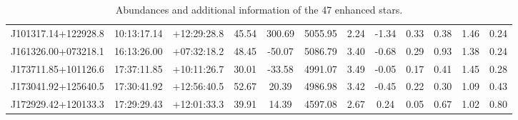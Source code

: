 \documentclass[a4paper,fleqn,usenatbib]{mnras}
\begin{document}
\begin{table}
\begin{tabular}{@{}cccccccccccc@{}}
			J101317.14+122928.8 & 10:13:17.14 & +12:29:28.8  & 45.54               	& 300.69              	& 5055.95             	& 2.24           	& -1.34              	& 0.33                   	& 0.38                     	& 1.46             	& 0.24       	\\
			J161326.00+073218.1 & 16:13:26.00 & +07:32:18.2  & 48.45               	& -50.07              	& 5086.79             	& 3.40           	& -0.68              	& 0.29                   	& 0.93                     	& 1.38             	& 0.24       	\\
			J173711.85+101126.6 & 17:37:11.85 & +10:11:26.7  & 30.01               	& -33.58              	& 4991.07             	& 3.49           	& -0.05              	& 0.17                   	& 0.41                     	& 1.45             	& 0.28       	\\
			J173041.92+125640.5 & 17:30:41.92 & +12:56:40.5  & 52.67               	& 20.39               	& 4986.98             	& 3.42           	& -0.45              	& 0.22                   	& 0.30                     	& 1.09             	& 0.43       	\\
			J172929.42+120133.3 & 17:29:29.43 & +12:01:33.3  & 39.91               	& 14.39               	& 4597.08             	& 2.67           	& 0.24               	& 0.05                   	& 0.67                     	& 1.02             	& 0.80       	\\ \bottomrule
		\end{tabular}
		\caption{Abundances and additional information of the 47 enhanced stars.}
	\end{table}
	
	
	
	
	
	\bsp	%
	\label{lastpage}
\end{document}
